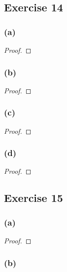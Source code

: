 \documentclass[14pt]{extarticle}
\begin{document}
\subsection{Exercise 14}

\subsubsection{(a)}

\begin{proof}

\end{proof}

\subsubsection{(b)}

\begin{proof}

\end{proof}

\subsubsection{(c)}

\begin{proof}

\end{proof}

\subsubsection{(d)}

\begin{proof}

\end{proof}

\subsection{Exercise 15}

\subsubsection{(a)}

\begin{proof}

\end{proof}

\subsubsection{(b)}
\end{document}
